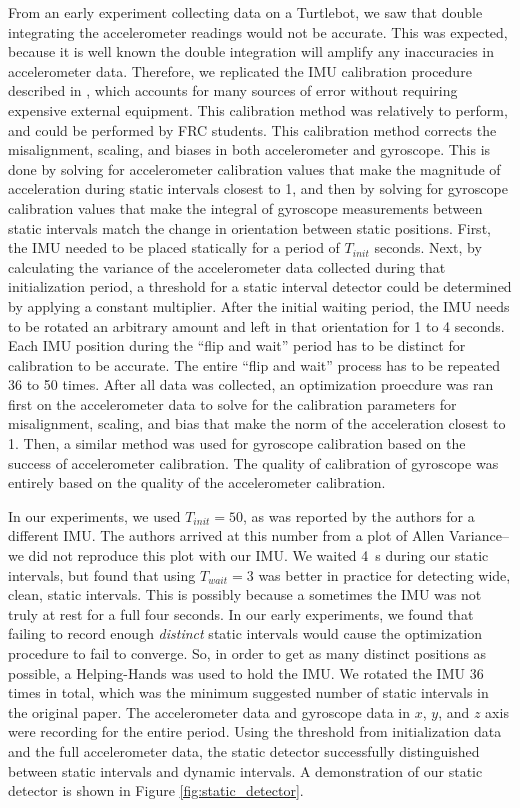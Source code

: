 \documentclass{article}
\begin{document}
    From an early experiment collecting data on a Turtlebot, we saw that double integrating the accelerometer readings would not be accurate. This was expected, because it is well known the double integration will amplify any inaccuracies in accelerometer data. Therefore, we replicated the IMU calibration procedure described in \cite{tedaldi_robust_2014}, which accounts for many sources of error without requiring expensive external equipment. This calibration method was relatively to perform, and could be performed by FRC students. This calibration method corrects the misalignment, scaling, and biases in both accelerometer and gyroscope. This is done by solving for accelerometer calibration values that make the magnitude of acceleration during static intervals closest to 1, and then by solving for gyroscope calibration values that make the integral of gyroscope measurements between static intervals match the change in orientation between static positions. First, the IMU needed to be placed statically for a period of $T_{init}$ seconds. Next, by calculating the variance of the accelerometer data collected during that initialization period, a threshold for a static interval detector could be determined by applying a constant multiplier. After the initial waiting period, the IMU needs to be rotated an arbitrary amount and left in that orientation for 1 to 4 seconds. Each IMU position during the ``flip and wait'' period has to be distinct for calibration to be accurate. The entire ``flip and wait'' process has to be repeated 36 to 50 times. After all data was collected, an optimization proecdure was ran first on the accelerometer data to solve for the calibration parameters for misalignment, scaling, and bias that make the norm of the acceleration closest to 1. Then, a similar method was used for gyroscope calibration based on the success of accelerometer calibration. The quality of calibration of gyroscope was entirely based on the quality of the accelerometer calibration.

    In our experiments, we used $T_{init}=50$, as was reported by the authors for a different IMU. The authors arrived at this number from a plot of Allen Variance--we did not reproduce this plot with our IMU. We waited \SI{4}{\second} during our static intervals, but found that using $T_{wait}=3$ was better in practice for detecting wide, clean, static intervals. This is possibly because a sometimes the IMU was not truly at rest for a full four seconds. In our early experiments, we found that failing to record enough \textit{distinct} static intervals would cause the optimization procedure to fail to converge. So, in order to get as many distinct positions as possible, a Helping-Hands was used to hold the IMU. We rotated the IMU 36 times in total, which was the minimum suggested number of static intervals in the original paper. The accelerometer data and gyroscope data in $x$, $y$, and $z$ axis were recording for the entire period. Using the threshold from initialization data and the full accelerometer data, the static detector successfully distinguished between static intervals and dynamic intervals. A demonstration of our static detector is shown in Figure \ref{fig:static_detector}.
\end{document}
